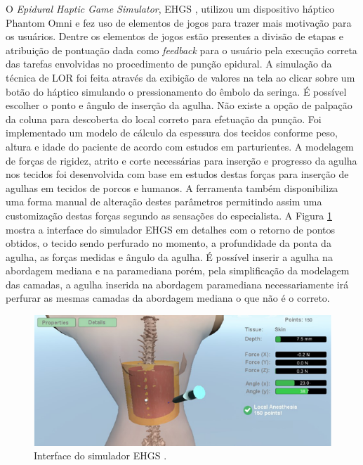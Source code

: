 O \textit{Epidural Haptic Game Simulator}, EHGS \cite{Brazil2017}, utilizou um dispositivo háptico Phantom Omni e fez uso de elementos de jogos para trazer mais motivação para os usuários. Dentre os elementos de jogos estão presentes a divisão de etapas e atribuição de pontuação dada como \textit{feedback} para o usuário pela execução correta das tarefas envolvidas no procedimento de punção epidural. A simulação da técnica de LOR foi feita através da exibição de valores na tela ao clicar sobre um botão do háptico simulando o pressionamento do êmbolo da seringa. É possível escolher o ponto e ângulo de inserção da agulha. Não existe a opção de palpação da coluna para descoberta do local correto para efetuação da punção. Foi implementado um modelo de cálculo da espessura dos tecidos conforme peso, altura e idade do paciente de acordo com estudos em parturientes. A modelagem de forças de rigidez, atrito e corte necessárias para inserção e progresso da agulha nos tecidos foi desenvolvida com base em estudos destas forças para inserção de agulhas em tecidos de porcos e humanos. A ferramenta também disponibiliza uma forma manual de alteração destes parâmetros permitindo assim uma customização destas forças segundo as sensações do especialista. A Figura \ref{fig:brasilSimulator} mostra a interface do simulador EHGS em detalhes com o retorno de pontos obtidos, o tecido sendo perfurado no momento, a profundidade da ponta da agulha, as forças medidas e ângulo da agulha. É possível inserir a agulha na abordagem mediana e na paramediana porém, pela simplificação da modelagem das camadas, a agulha inserida na abordagem paramediana necessariamente irá perfurar as mesmas camadas da abordagem mediana o que não é o correto.  

\begin{figure}[ht!]
    \centering
    \includegraphics[width=0.8\linewidth]{capitulos/figuras/brasilSimulator.png} 
    \caption{Interface do simulador EHGS \cite{Brazil2017}.}
    \label{fig:brasilSimulator}
\end{figure}

